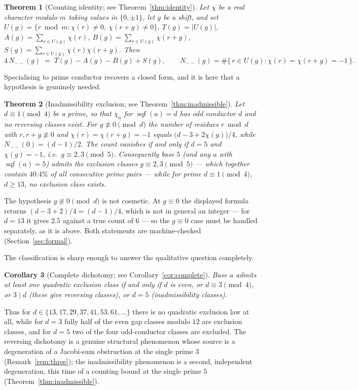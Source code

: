 \documentclass[11pt,reqno]{amsart}
\theoremstyle{plain}
\newtheorem{theorem}{Theorem}
\newtheorem{corollary}[theorem]{Corollary}
\theoremstyle{definition}
\DeclareMathOperator{\sqf}{sqf}
\begin{document}
\begin{theorem}[Counting identity; see Theorem~\ref{thm:identity}]
Let $\chi$ be a real character modulo $m$ taking values in $\{0, \pm 1\}$, let
$g$ be a shift, and set
$U(g) = \{ r \bmod m : \chi(r) \neq 0,\ \chi(r+g) \neq 0 \}$,
$T(g) = |U(g)|$, $A(g) = \sum_{r \in U(g)} \chi(r)$,
$B(g) = \sum_{r \in U(g)} \chi(r+g)$,
$S(g) = \sum_{r \in U(g)} \chi(r)\chi(r+g)$. Then
\[
  4\, N_{--}(g) \;=\; T(g) - A(g) - B(g) + S(g),
  \qquad
  N_{--}(g) = \#\{\, r \in U(g) : \chi(r) = \chi(r+g) = -1 \,\}.
\]
\end{theorem}

Specialising to prime conductor recovers a closed form, and it is here that a
hypothesis is genuinely needed.

\begin{theorem}[Inadmissibility exclusion; see Theorem~\ref{thm:inadmissible}]
Let $d \equiv 1 \pmod 4$ be a prime, so that $\chi_a$ for $\sqf(a) = d$ has
odd conductor $d$ and no reversing classes exist. For $g \not\equiv 0 \pmod d$
the number of residues $r \bmod d$ with $r, r+g \not\equiv 0$ and
$\chi(r) = \chi(r+g) = -1$ equals $\bigl(d - 3 + 2\chi(g)\bigr)/4$, while
$N_{--}(0) = (d-1)/2$. The count vanishes if and only if $d = 5$ and
$\chi(g) = -1$, i.e.\ $g \equiv 2, 3 \pmod 5$. Consequently base $5$ (and any
$a$ with $\sqf(a) = 5$) admits the exclusion classes $g \equiv 2, 3 \pmod 5$
--- which together contain $40.4\%$ of all consecutive prime pairs --- while
for prime $d \equiv 1 \pmod 4$, $d \ge 13$, no exclusion class exists.
\end{theorem}

The hypothesis $g \not\equiv 0 \pmod d$ is not cosmetic. At $g \equiv 0$ the
displayed formula returns $(d-3+2)/4 = (d-1)/4$, which is not in general an
integer --- for $d = 13$ it gives $2.5$ against a true count of $6$ --- so the
$g \equiv 0$ case must be handled separately, as it is above. Both statements
are machine-checked (Section~\ref{sec:formal}).

The classification is sharp enough to answer the qualitative question
completely.

\begin{corollary}[Complete dichotomy; see Corollary~\ref{cor:complete}]
Base $a$ admits at least one quadratic exclusion class if and only if $d$ is
even, or $d \equiv 3 \pmod 4$, or $3 \mid d$ (these give reversing classes), or
$d = 5$ (inadmissibility classes).
\end{corollary}

Thus for $d \in \{13, 17, 29, 37, 41, 53, 61, \dots\}$ there is no quadratic
exclusion law at all, while for $d = 3$ fully half of the even gap classes
modulo $12$ are exclusion classes, and for $d = 5$ two of the four
odd-conductor classes are excluded. The reversing dichotomy is a genuine
structural phenomenon whose source is a degeneration of a Jacobi-sum
obstruction at the single prime $3$ (Remark~\ref{rem:three}); the
inadmissibility phenomenon is a second, independent degeneration, this time of
a counting bound at the single prime $5$
(Theorem~\ref{thm:inadmissible}).
\end{document}
